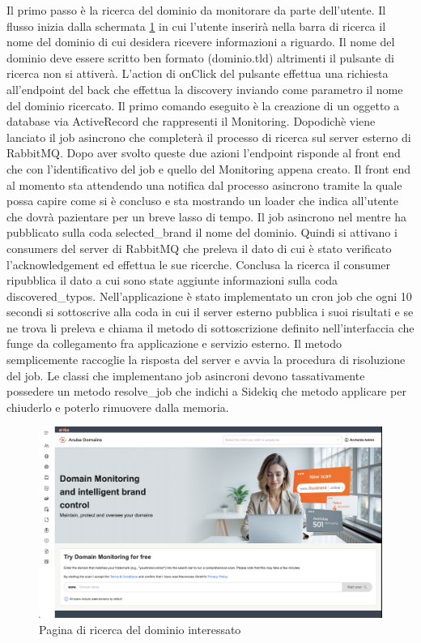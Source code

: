 \documentclass[target=bach,aauheader=,style=]{thud}
\begin{document}
Il primo passo è la ricerca del dominio da monitorare da parte dell'utente. Il flusso inizia dalla schermata \ref{fig:search_section} in cui l'utente inserirà nella barra di
ricerca il nome del dominio di cui desidera ricevere informazioni a riguardo. Il nome del dominio deve essere scritto ben formato (dominio.tld) altrimenti il pulsante di
ricerca non si attiverà. L'action di onClick del pulsante effettua una richiesta all'endpoint del back che effettua la discovery inviando come parametro il nome del dominio ricercato.
Il primo comando eseguito è la creazione di un oggetto a database via ActiveRecord che rappresenti il Monitoring. Dopodichè viene lanciato il job asincrono che completerà il processo
di ricerca sul server esterno di RabbitMQ. Dopo aver svolto queste due azioni l'endpoint risponde al front end che con l'identificativo del job e quello del Monitoring appena creato.
Il front end al momento sta attendendo una notifica dal processo asincrono tramite la quale possa capire come si è concluso e sta mostrando un loader che indica all'utente che dovrà
pazientare per un breve lasso di tempo. Il job asincrono nel mentre ha pubblicato sulla coda selected\_brand il nome del dominio. Quindi si attivano i consumers del server di RabbitMQ che preleva
il dato di cui è stato verificato l'acknowledgement ed effettua le sue ricerche. Conclusa la ricerca il consumer ripubblica il dato a cui sono state aggiunte informazioni sulla coda
discovered\_typos. Nell'applicazione è stato implementato un cron job che ogni 10 secondi si sottoscrive alla coda in cui il server esterno pubblica i suoi risultati e se ne trova li
preleva e chiama il metodo di sottoscrizione definito nell'interfaccia che funge da collegamento fra applicazione e servizio esterno. Il metodo semplicemente raccoglie la risposta
del server e avvia la procedura di risoluzione del job. Le classi che implementano job asincroni devono tassativamente possedere un metodo resolve\_job che indichi a Sidekiq che
metodo applicare per chiuderlo e poterlo rimuovere dalla memoria. %


\begin{figure}[h]
\centering
\includegraphics[width=0.8\linewidth]{Domain_search.png}
\caption{Pagina di ricerca del dominio interessato}
\label{fig:search_section}
\end{figure}
\end{document}
